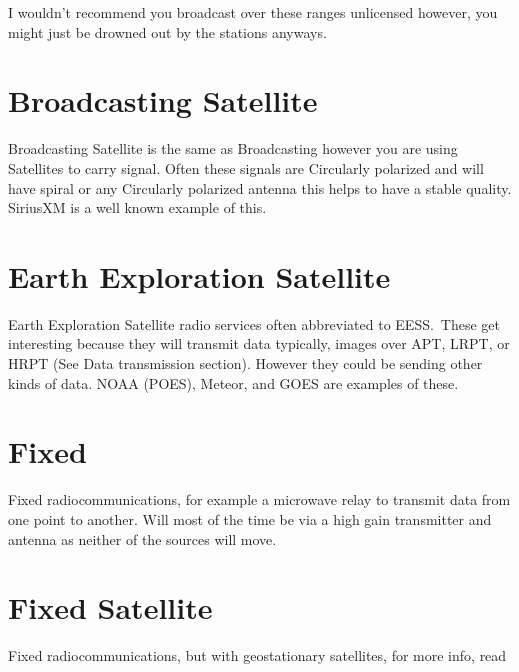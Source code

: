 \documentclass{book}
\begin{document}
        I wouldn't recommend you broadcast over these ranges unlicensed however, you might just 
        be drowned out by the stations anyways. 
    \section{Broadcasting Satellite}
        Broadcasting Satellite is the same as Broadcasting however you are using Satellites to carry signal.
         Often these signals are Circularly polarized and will have spiral or any Circularly polarized antenna
        this helps to have a stable quality. SiriusXM is a well known example of this.
    \section{Earth Exploration Satellite}
        Earth Exploration Satellite radio services often abbreviated to EESS.\ 
        These get interesting because they will transmit data typically,
        images over APT, LRPT, or HRPT (See Data transmission section). 
        However they could be sending other kinds of data.
        NOAA (POES), Meteor, and GOES are examples of these.
    \section{Fixed}
        Fixed radiocommunications, for example a microwave relay to transmit data from one point to another.
        Will most of the time be via a high gain transmitter and antenna as neither of the
        sources will move.
    \section{Fixed Satellite}
        Fixed radiocommunications, but with geostationary satellites, for more info, read 
\end{document}
